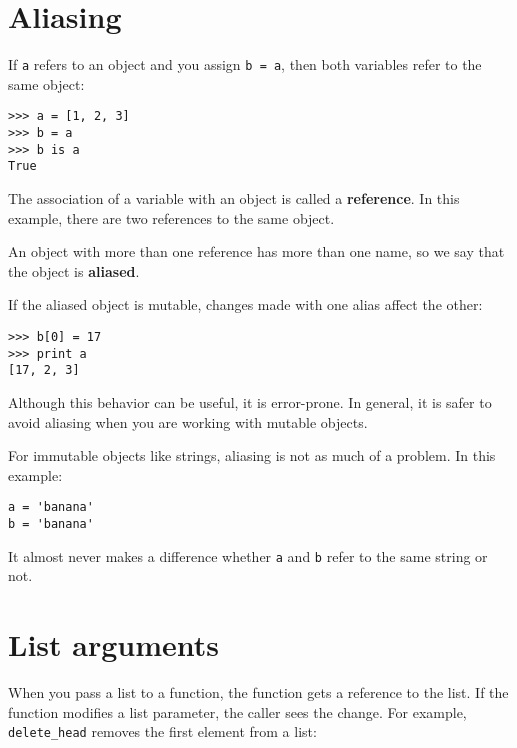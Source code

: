

\section{Aliasing}


If {\tt a} refers to an object and you assign {\tt b = a},
then both variables refer to the same object:

\beforeverb
\begin{verbatim}
>>> a = [1, 2, 3]
>>> b = a
>>> b is a
True
\end{verbatim}
\afterverb
%

The association of a variable with an object is called a {\bf
reference}.  In this example, there are two references to the same
object.


An object with more than one reference has more
than one name, so we say that the object is {\bf aliased}.


If the aliased object is mutable, 
changes made with one alias affect
the other:

\beforeverb
\begin{verbatim}
>>> b[0] = 17
>>> print a
[17, 2, 3]
\end{verbatim}
\afterverb
%
Although this behavior can be useful, it is error-prone.  In general,
it is safer to avoid aliasing when you are working with mutable
objects.


For immutable objects like strings, aliasing is not as much of a
problem.  In this example:

\beforeverb
\begin{verbatim}
a = 'banana'
b = 'banana'
\end{verbatim}
\afterverb
%
It almost never makes a difference whether {\tt a} and {\tt b} refer
to the same string or not.


\section{List arguments}


When you pass a list to a function, the function gets a reference
to the list.
If the function modifies a list parameter, the caller sees the change.
For example, \verb"delete_head" removes the first element from a list:

